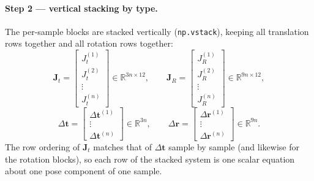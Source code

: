 \documentclass[11pt]{article}
\newcommand{\R}{\mathbb{R}}
\begin{document}
\paragraph{Step 2 --- vertical stacking by type.}
The per-sample blocks are stacked vertically (\texttt{np.vstack}), keeping all
translation rows together and all rotation rows together:
\begin{equation}
\mathbf{J}_t =
\begin{bmatrix} J_t^{(1)} \\ J_t^{(2)} \\ \vdots \\ J_t^{(n)} \end{bmatrix} \in \R^{3n\times12},
\qquad
\mathbf{J}_R =
\begin{bmatrix} J_R^{(1)} \\ J_R^{(2)} \\ \vdots \\ J_R^{(n)} \end{bmatrix} \in \R^{9n\times12},
\end{equation}
\begin{equation}
\Delta\mathbf{t} =
\begin{bmatrix} \Delta\bm{t}^{(1)} \\ \vdots \\ \Delta\bm{t}^{(n)} \end{bmatrix} \in \R^{3n},
\qquad
\Delta\mathbf{r} =
\begin{bmatrix} \Delta\bm{r}^{(1)} \\ \vdots \\ \Delta\bm{r}^{(n)} \end{bmatrix} \in \R^{9n}.
\end{equation}
The row ordering of $\mathbf{J}_t$ matches that of $\Delta\mathbf{t}$ sample by sample
(and likewise for the rotation blocks), so each row of the stacked system is one
scalar equation about one pose component of one sample.
\end{document}
